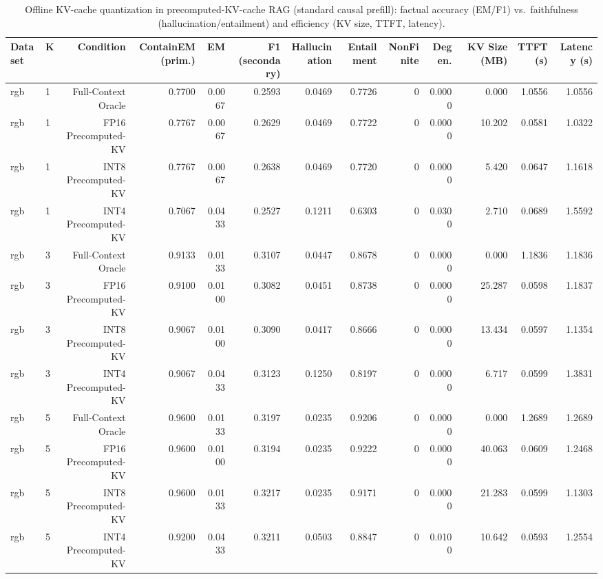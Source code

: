 \begin{table}[t]
\centering
\small
\begin{tabular}{llrrrrrrrrrrr}
\toprule
Dataset & K & Condition & ContainEM (prim.) & EM & F1 (secondary) & Hallucination & Entailment & NonFinite & Degen. & KV Size (MB) & TTFT (s) & Latency (s) \\
\midrule
rgb & 1 & Full-Context Oracle & 0.7700 & 0.0067 & 0.2593 & 0.0469 & 0.7726 & 0 & 0.0000 & 0.000 & 1.0556 & 1.0556 \\
rgb & 1 & FP16 Precomputed-KV & 0.7767 & 0.0067 & 0.2629 & 0.0469 & 0.7722 & 0 & 0.0000 & 10.202 & 0.0581 & 1.0322 \\
rgb & 1 & INT8 Precomputed-KV & 0.7767 & 0.0067 & 0.2638 & 0.0469 & 0.7720 & 0 & 0.0000 & 5.420 & 0.0647 & 1.1618 \\
rgb & 1 & INT4 Precomputed-KV & 0.7067 & 0.0433 & 0.2527 & 0.1211 & 0.6303 & 0 & 0.0300 & 2.710 & 0.0689 & 1.5592 \\
rgb & 3 & Full-Context Oracle & 0.9133 & 0.0133 & 0.3107 & 0.0447 & 0.8678 & 0 & 0.0000 & 0.000 & 1.1836 & 1.1836 \\
rgb & 3 & FP16 Precomputed-KV & 0.9100 & 0.0100 & 0.3082 & 0.0451 & 0.8738 & 0 & 0.0000 & 25.287 & 0.0598 & 1.1837 \\
rgb & 3 & INT8 Precomputed-KV & 0.9067 & 0.0100 & 0.3090 & 0.0417 & 0.8666 & 0 & 0.0000 & 13.434 & 0.0597 & 1.1354 \\
rgb & 3 & INT4 Precomputed-KV & 0.9067 & 0.0433 & 0.3123 & 0.1250 & 0.8197 & 0 & 0.0000 & 6.717 & 0.0599 & 1.3831 \\
rgb & 5 & Full-Context Oracle & 0.9600 & 0.0133 & 0.3197 & 0.0235 & 0.9206 & 0 & 0.0000 & 0.000 & 1.2689 & 1.2689 \\
rgb & 5 & FP16 Precomputed-KV & 0.9600 & 0.0100 & 0.3194 & 0.0235 & 0.9222 & 0 & 0.0000 & 40.063 & 0.0609 & 1.2468 \\
rgb & 5 & INT8 Precomputed-KV & 0.9600 & 0.0133 & 0.3217 & 0.0235 & 0.9171 & 0 & 0.0000 & 21.283 & 0.0599 & 1.1303 \\
rgb & 5 & INT4 Precomputed-KV & 0.9200 & 0.0433 & 0.3211 & 0.0503 & 0.8847 & 0 & 0.0100 & 10.642 & 0.0593 & 1.2554 \\
\bottomrule
\end{tabular}
\caption{Offline KV-cache quantization in precomputed-KV-cache RAG (standard causal prefill): factual accuracy (EM/F1) vs.\ faithfulness (hallucination/entailment) and efficiency (KV size, TTFT, latency).}
\label{tab:main}
\end{table}

